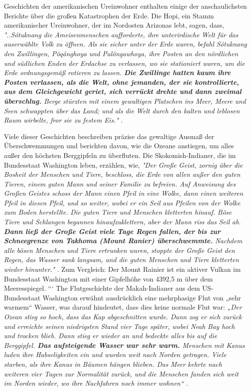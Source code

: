 \documentclass[10pt,twocolumn,letterpaper]{article}
\begin{document}
Geschichten der amerikanischen Ureinwohner enthalten einige der anschaulichsten Berichte über die großen Katastrophen der Erde. Die Hopi, ein Stamm amerikanischer Ureinwohner, der im Nordosten Arizonas lebt, sagen, dass, \textit{"..Sótuknang die Ameisenmenschen aufforderte, ihre unterirdische Welt für das auserwählte Volk zu öffnen. Als sie sicher unter der Erde waren, befahl Sótuknang den Zwillingen, Pöqánghoya und Palöngawhoya, ihre Posten an den nördlichen und südlichen Enden der Erdachse zu verlassen, wo sie stationiert waren, um die Erde ordnungsgemäß rotieren zu lassen. \textbf{Die Zwillinge hatten kaum ihre Posten verlassen, als die Welt, ohne jemanden, der sie kontrollierte, aus dem Gleichgewicht geriet, sich verrückt drehte und dann zweimal überschlug.} Berge stürzten mit einem gewaltigen Platschen ins Meer, Meere und Seen schwappten über das Land; und als die Welt durch den kalten und leblosen Raum wirbelte, fror sie zu festem Eis."} \cite{4}.

Viele dieser Geschichten beschreiben präzise das gewaltige Ausmaß der Überschwemmungen und berichten davon, wie die Ozeane anstiegen, um alles außer den höchsten Berggipfeln zu überfluten. Die Skokomish-Indianer, die im Bundesstaat Washington leben, erzählen, wie, \textit{"Der Große Geist, zornig über die Bosheit der Menschen und Tiere, beschloss, die Erde von allen außer den guten Tieren, einem guten Mann und seiner Familie zu befreien. Auf Anweisung des Großen Geistes schoss der Mann einen Pfeil in eine Wolke, dann einen weiteren Pfeil in diesen Pfeil, und so weiter, wobei er ein Seil aus Pfeilen von der Wolke zum Boden herstellte. Die guten Tiere und Menschen kletterten hinauf. Böse Tiere und Schlangen begannen hinaufzuklettern, aber der Mann riss das Seil ab. \textbf{Dann ließ der Große Geist viele Tage Regen fallen, der bis zur Schneegrenze von Takhoma (Mount Ranier) überschwemmte.} Nachdem alle bösen Menschen und Tiere ertrunken waren, stoppte der Große Geist den Regen, das Wasser sank langsam, und die guten Menschen und Tiere kletterten wieder hinunter."} \cite{3}. Zum Vergleich: Der Mount Rainier ist ein aktiver Vulkan im Bundesstaat Washington mit einer Gipfelhöhe von 4392,5 m über dem Meeresspiegel.
```
The Flutgeschichte der Makah-Indianer aus dem US-Bundesstaat Washington erwähnt ausdrücklich eine mehrphasige Flut von „sehr warmem“ Wasser, was darauf hindeutet, dass dies keine normale Flut war: \textit{„Der Ozean stieg so hoch, dass das Kap abgeschnitten wurde. Dann zog er sich zurück und erreichte seinen niedrigsten Stand vier Tage später, wobei Neah Bay hoch und trocken blieb. Dann stieg er wieder an und bedeckte alles bis auf die Berggipfel. \textbf{Das aufsteigende Wasser war sehr warm.} Menschen mit Kanus luden ihre Habseligkeiten ein und wurden weit nach Norden getragen. Viele starben, als ihre Kanus in Bäumen hängen blieben. Das Meer kehrte nach weiteren vier Tagen zur Normalität zurück, und die Menschen fanden sich weit im Norden wieder, wo ihre Nachfahren noch immer wohnen“} \cite{3}.
\end{document}
